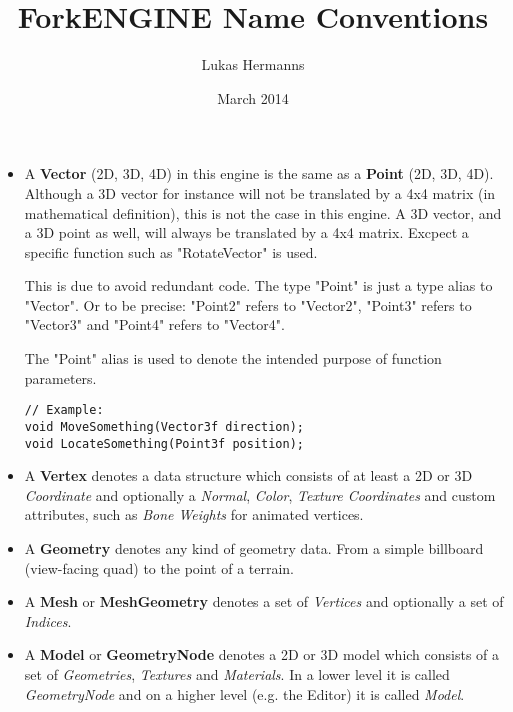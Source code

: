 \documentclass{article}
\title{ForkENGINE Name Conventions}
\author{Lukas Hermanns}
\date{March 2014}
\begin{document}


\maketitle
\begin{itemize}

\item
A \textbf{Vector} (2D, 3D, 4D) in this engine is the same as a \textbf{Point} (2D, 3D, 4D).
Although a 3D vector for instance will not be translated by a 4x4 matrix (in mathematical definition),
this is not the case in this engine. A 3D vector, and a 3D point as well, will always be translated by a 4x4 matrix.
Excpect a specific function such as "RotateVector" is used.

This is due to avoid redundant code. The type "Point" is just a type alias to "Vector".
Or to be precise: "Point2" refers to "Vector2", "Point3" refers to "Vector3" and "Point4" refers to "Vector4".

The "Point" alias is used to denote the intended purpose of function parameters.

\begin{lstlisting}
// Example:
void MoveSomething(Vector3f direction);
void LocateSomething(Point3f position);
\end{lstlisting}

\item
A \textbf{Vertex} denotes a data structure which consists of at least a 2D or 3D \textit{Coordinate} and
optionally a \textit{Normal}, \textit{Color}, \textit{Texture Coordinates} and custom attributes,
such as \textit{Bone Weights} for animated vertices.

\item
A \textbf{Geometry} denotes any kind of geometry data. From a simple billboard (view-facing quad) to the point of a terrain.

\item
A \textbf{Mesh} or \textbf{MeshGeometry} denotes a set of \textit{Vertices} and optionally a set of \textit{Indices}.

\item
A \textbf{Model} or \textbf{GeometryNode} denotes a 2D or 3D model which consists of a set of \textit{Geometries}, \textit{Textures} and \textit{Materials}.
In a lower level it is called \textit{GeometryNode} and on a higher level (e.g. the Editor) it is called \textit{Model}.


\end{itemize}
\end{document}
